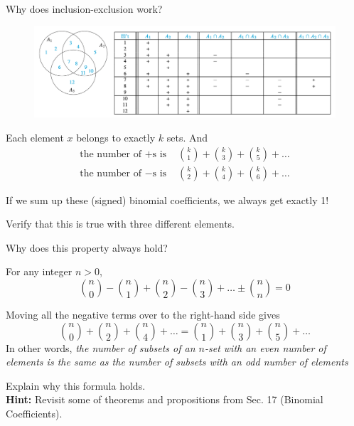 \documentclass[10pt]{beamer}
\begin{document}
\begin{frame}{Why does inclusion-exclusion work?}
\footnotesize
\begin{figure}
\includegraphics[width=\textwidth]{images/inclusion_exclusion_proof}
\end{figure}

Each element $x$ belongs to exactly $k$ sets. And
%
\begin{align*}
\text{the number of $+$s is } &	\binom{k}{1} + \binom{k}{3} + \binom{k}{5} + \hdots \\
\text{the number of $-$s is } &	\binom{k}{2} + \binom{k}{4} + \binom{k}{6} + \hdots 
\end{align*}

If we sum up these (signed) binomial coefficients, we always get exactly 1! 

\vfill 
\begin{myyellowbox}[title=Exercise]
Verify that this is true with three different elements. 
\end{myyellowbox}
\pause 
Why does this property always hold?
\end{frame}

\begin{frame}
\small 
\begin{mygreenbox}[title=\text{Proposition (Scheinerman Exercise 17.15)}]
For any integer $n>0$,
\[ \binom{n}{0} - \binom{n}{1} + \binom{n}{2} - \binom{n}{3} + \hdots \pm \binom{n}{n} =0 \] 
\end{mygreenbox}
\vfill  \pause 
\begin{myredbox}[title=Remark]
Moving all the negative terms over to the right-hand side gives
\[ \binom{n}{0} + \binom{n}{2} + \binom{n}{4} + \hdots = \binom{n}{1} + \binom{n}{3} + \binom{n}{5} + \hdots \]
In other words, \textit{the number of subsets of an $n$-set with an even number of elements is the same as the number of subsets with an odd number of elements}
\end{myredbox}
\vfill  \pause 
\begin{myyellowbox}[title=Group activity (5 minutes)]
Explain why this formula holds. \\
\textbf{Hint:} Revisit some of theorems and propositions from Sec. 17 (Binomial Coefficients).
\end{myyellowbox}


\end{frame}
\end{document}
